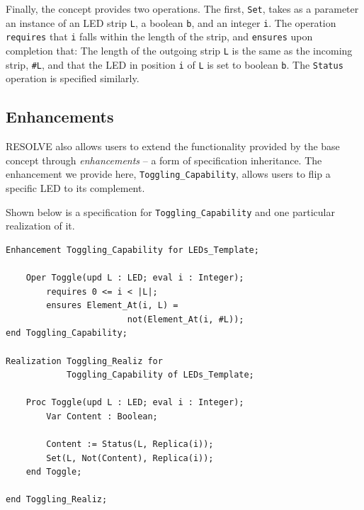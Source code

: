 \documentclass{sig-alternate}
\begin{document}
Finally, the concept provides two operations. The first, \texttt{Set}, takes as a parameter an instance of an LED strip \texttt{L}, a boolean \texttt{b}, and an integer \texttt{i}. The operation \texttt{requires} that \texttt{i} falls within the length of the strip, and \texttt{ensures} upon completion that: The length of the outgoing strip \texttt{L} is the same as the incoming strip, \texttt{\#L}, and that the LED in position \texttt{i} of \texttt{L} is set to boolean \texttt{b}. The \texttt{Status} operation is specified similarly. 


\subsection{Enhancements}

RESOLVE also allows users to extend the functionality provided by the base concept through \textit{enhancements} -- a form of specification inheritance. The enhancement we provide here, \texttt{Toggling\_Capability}, allows users to flip a specific LED to its complement.

Shown below is a specification for \texttt{Toggling\_Capability} and one particular realization of it.

\begin{verbatim}
Enhancement Toggling_Capability for LEDs_Template;

    Oper Toggle(upd L : LED; eval i : Integer);
        requires 0 <= i < |L|;
        ensures Element_At(i, L) = 
                        not(Element_At(i, #L));
end Toggling_Capability;

Realization Toggling_Realiz for
            Toggling_Capability of LEDs_Template;

    Proc Toggle(upd L : LED; eval i : Integer);
        Var Content : Boolean;
        
        Content := Status(L, Replica(i));
        Set(L, Not(Content), Replica(i));
    end Toggle;
    
end Toggling_Realiz;
\end{verbatim}
\end{document}
